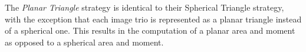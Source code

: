 


The \textit{Planar Triangle} strategy is identical to their Spherical Triangle strategy, with the exception that each image trio is represented as a planar triangle instead of a spherical one.
This results in the computation of a planar area and moment as opposed to a spherical area and moment.

